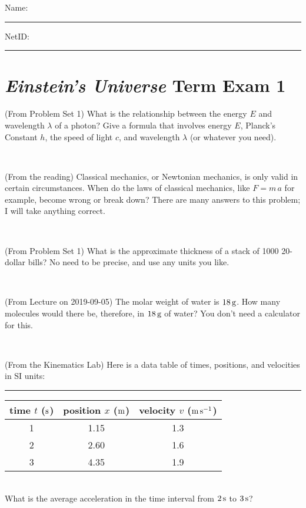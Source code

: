 \documentclass[12pt, letterpaper]{article}
\begin{document}
\cleardoublepage



\noindent
Name: \rule[-1ex]{0.60\textwidth}{0.1pt}
NetID: \rule[-1ex]{0.20\textwidth}{0.1pt}

\section*{\textsl{Einstein's Universe} Term Exam 1}
\setcounter{problem}{1}


\begin{problem} (From Problem Set 1)
What is the relationship between the energy $E$ and wavelength
$\lambda$ of a photon? Give a formula that involves energy $E$,
Planck's Constant $h$, the speed of light $c$, and wavelength
$\lambda$ (or whatever you need).
\end{problem}

\vfill ~

\begin{problem} (From the reading)
Classical mechanics, or Newtonian mechanics, is only valid in certain
circumstances. When do the laws of classical mechanics, like $F =
m\,a$ for example, become wrong or break down? There are many answers
to this problem; I will take anything correct.
\end{problem}


\vfill ~

\begin{problem} (From Problem Set 1)
What is the approximate thickness of a stack of 1000 20-dollar bills?
No need to be precise, and use any units you like.
\end{problem}


\vfill ~

\begin{problem} (From Lecture on 2019-09-05)
The molar weight of water is $18\,\mathrm{g}$. How many molecules would there
be, therefore, in $18\,\mathrm{g}$ of water? You don't need a calculator for
this.
\end{problem}


\vfill ~


\clearpage


\begin{problem} (From the Kinematics Lab)
Here is a data table of times, positions, and velocities in SI units:\\
\rule{1.0in}{0pt}\begin{tabular}{c|c|c}
time $t$ ($\mathrm{s}$) & position $x$ ($\mathrm{m}$) & velocity $v$ ($\mathrm{m}\,\mathrm{s}^{-1}$) \\
\hline
1 & 1.15 & 1.3 \\
2 & 2.60 & 1.6 \\
3 & 4.35 & 1.9 \\
\hline
\end{tabular}\\
What is the average acceleration in the time interval from $2\,\mathrm{s}$ to $3\,\mathrm{s}$?
\end{problem}
\end{document}
